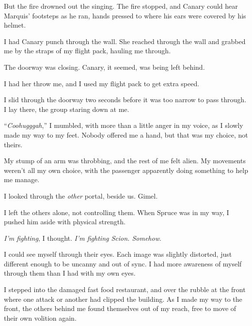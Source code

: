 But the fire drowned out the singing.  The fire stopped, and Canary could hear Marquis' footsteps as he ran, hands pressed to where his ears were covered by his helmet.



I had Canary punch through the wall.  She reached through the wall and grabbed me by the straps of my flight pack, hauling me through.



The doorway was closing.  Canary, it seemed, was being left behind.



I had her throw me, and I used my flight pack to get extra speed.



I slid through the doorway two seconds before it was too narrow to pass through.  I lay there, the group staring down at me.



``\emph{Coohugggah},'' I mumbled, with more than a little anger in my voice, as I slowly made my way to my feet.  Nobody offered me a hand, but that was my choice, not theirs.



My stump of an arm was throbbing, and the rest of me felt alien.  My movements weren't all my own choice, with the passenger apparently doing something to help me manage.



I looked through the \emph{other} portal, beside us.  Gimel.



I left the others alone, not controlling them.  When Spruce was in my way, I pushed him aside with physical strength.



\emph{I'm fighting}, I thought.  \emph{I'm fighting Scion.  Somehow}.



I could see myself through their eyes.  Each image was slightly distorted, just different enough to be uncanny and out of sync.  I had more awareness of myself through them than I had with my own eyes.



I stepped into the damaged fast food restaurant, and over the rubble at the front where one attack or another had clipped the building.  As I made my way to the front, the others behind me found themselves out of my reach, free to move of their own volition again.



